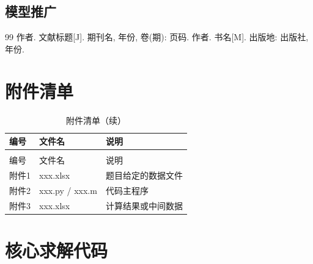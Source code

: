 \documentclass[a4paper, 12pt]{article}
\begin{document}
\subsection{模型推广}

\label{sec:refstart}  %
\begin{thebibliography}{99}
   作者. 文献标题[J]. 期刊名, 年份, 卷(期): 页码.
   作者. 书名[M]. 出版地: 出版社, 年份.
\end{thebibliography}

\appendix

\section{附件清单}

\begin{longtable}{>{\centering\arraybackslash}p{}>{\centering\arraybackslash}p{}>{\centering\arraybackslash}p{}}
  \caption{附件清单}
  \label{tab:appendix} \\
  \toprule
  编号 & 文件名 & 说明 \\
  \midrule
  \endfirsthead
  \caption{附件清单（续）} \\
  \toprule
  编号 & 文件名 & 说明 \\
  \midrule
  \endhead
  \bottomrule
  \endfoot
  附件1 & xxx.xlsx & 题目给定的数据文件 \\
  附件2 & xxx.py / xxx.m & 代码主程序 \\
  附件3 & xxx.xlsx & 计算结果或中间数据 \\
\end{longtable}

\section{核心求解代码}




\end{document}
